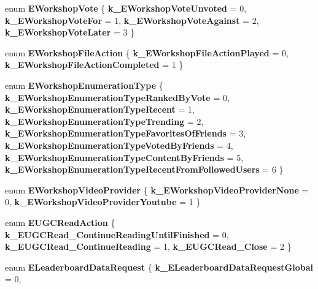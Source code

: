 \begin{DoxyCompactItemize}
enum {\bfseries E\+Workshop\+Vote} \{ {\bfseries k\+\_\+\+E\+Workshop\+Vote\+Unvoted} = 0, 
{\bfseries k\+\_\+\+E\+Workshop\+Vote\+For} = 1, 
{\bfseries k\+\_\+\+E\+Workshop\+Vote\+Against} = 2, 
{\bfseries k\+\_\+\+E\+Workshop\+Vote\+Later} = 3
 \}
\item 
\mbox{\label{namespace_valve_1_1_steamworks_ad5a0099039aa3250083ce3adc7f61ef4}} 
enum {\bfseries E\+Workshop\+File\+Action} \{ {\bfseries k\+\_\+\+E\+Workshop\+File\+Action\+Played} = 0, 
{\bfseries k\+\_\+\+E\+Workshop\+File\+Action\+Completed} = 1
 \}
\item 
\mbox{\label{namespace_valve_1_1_steamworks_a001229b5c5fa0e2569bee944d8ca9cf7}} 
enum {\bfseries E\+Workshop\+Enumeration\+Type} \{ \newline
{\bfseries k\+\_\+\+E\+Workshop\+Enumeration\+Type\+Ranked\+By\+Vote} = 0, 
{\bfseries k\+\_\+\+E\+Workshop\+Enumeration\+Type\+Recent} = 1, 
{\bfseries k\+\_\+\+E\+Workshop\+Enumeration\+Type\+Trending} = 2, 
{\bfseries k\+\_\+\+E\+Workshop\+Enumeration\+Type\+Favorites\+Of\+Friends} = 3, 
\newline
{\bfseries k\+\_\+\+E\+Workshop\+Enumeration\+Type\+Voted\+By\+Friends} = 4, 
{\bfseries k\+\_\+\+E\+Workshop\+Enumeration\+Type\+Content\+By\+Friends} = 5, 
{\bfseries k\+\_\+\+E\+Workshop\+Enumeration\+Type\+Recent\+From\+Followed\+Users} = 6
 \}
\item 
\mbox{\label{namespace_valve_1_1_steamworks_a61a5ccce84b70e757234e98c90c0cc97}} 
enum {\bfseries E\+Workshop\+Video\+Provider} \{ {\bfseries k\+\_\+\+E\+Workshop\+Video\+Provider\+None} = 0, 
{\bfseries k\+\_\+\+E\+Workshop\+Video\+Provider\+Youtube} = 1
 \}
\item 
\mbox{\label{namespace_valve_1_1_steamworks_ac4889b14ff19052ede184ae58cfc5720}} 
enum {\bfseries E\+U\+G\+C\+Read\+Action} \{ {\bfseries k\+\_\+\+E\+U\+G\+C\+Read\+\_\+\+Continue\+Reading\+Until\+Finished} = 0, 
{\bfseries k\+\_\+\+E\+U\+G\+C\+Read\+\_\+\+Continue\+Reading} = 1, 
{\bfseries k\+\_\+\+E\+U\+G\+C\+Read\+\_\+\+Close} = 2
 \}
\item 
\mbox{\label{namespace_valve_1_1_steamworks_a5a582107e70537c761a1e95746e62759}} 
enum {\bfseries E\+Leaderboard\+Data\+Request} \{ {\bfseries k\+\_\+\+E\+Leaderboard\+Data\+Request\+Global} = 0, 

\end{DoxyCompactItemize}
